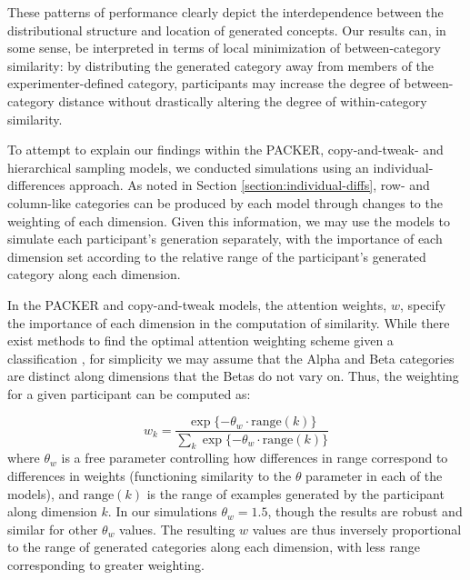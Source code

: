 \documentclass[12pt]{article}
\begin{document}
\begin{flushleft}
These patterns of performance clearly depict the interdependence between the distributional structure and location of generated concepts. Our results can, in some sense, be interpreted in terms of local minimization of between-category similarity: by distributing the generated category away from members of the experimenter-defined category, participants may increase the degree of between-category distance without drastically altering the degree of within-category similarity.

To attempt to explain our findings within the PACKER, copy-and-tweak- and hierarchical sampling models, we conducted simulations using an individual-differences approach. As noted in Section \ref{section:individual-diffs}, row- and column-like categories can be produced by each model through changes to the weighting of each dimension. Given this information, we may use the models to simulate each participant's generation separately, with the importance of each dimension set according to the relative range of the participant's generated category along each dimension. 

In the PACKER and copy-and-tweak models, the attention weights, $w$, specify the importance of each dimension in the computation of similarity. While there exist methods to find the optimal attention weighting scheme given a classification \citep[see][]{vanpaemel2012using}, for simplicity we may assume that the Alpha and Beta categories are distinct along dimensions that the Betas do not vary on. Thus, the weighting for a given participant can be computed as:

\begin{equation}
w_k = \dfrac
{\exp{ \{ -\theta_w \cdot\text{range}(k)}  \} } 
{ \sum_k {\exp{ \{ -\theta_w \cdot\text{range}(k)}  \} } }
\label{eq:range-weight}
\end{equation}
% 
where $\theta_w$ is a free parameter controlling how differences in range correspond to differences in weights (functioning similarity to the $\theta$ parameter in each of the models), and $\text{range}(k)$ is the range of examples generated by the participant along dimension $k$. In our simulations $\theta_w = 1.5$, though the results are robust and similar for other $\theta_w$ values. The resulting $w$ values are thus inversely proportional to the range of generated categories along each dimension, with less range corresponding to greater weighting.


\end{flushleft}
\end{document}
